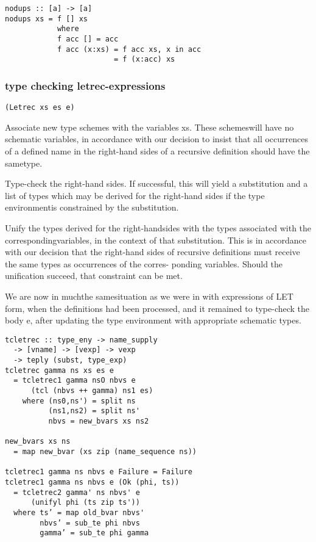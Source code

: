 \documentclass[8pt]{extarticle}
\begin{document}
\begin{multicols*}{2}
\begin{verbatim}
nodups :: [a] -> [a]
nodups xs = f [] xs
            where
            f acc [] = acc
            f acc (x:xs) = f acc xs, x in acc
                         = f (x:acc) xs
\end{verbatim}

\vfill\null
\columnbreak

\subsubsection{type checking letrec-expressions}

\verb|(Letrec xs es e)|

Associate new type schemes with the variables xs. These schemeswill
have no schematic variables, in accordance with our decision to insist
that all occurrences of a defined name in the right-hand sides of a
recursive definition should have the sametype.

Type-check the right-hand sides. If successful, this will yield a
substitution and a list of types which may be derived for the right-hand
sides if the type environmentis constrained by the substitution.

Unify the types derived for the right-handsides with the types associated
with the correspondingvariables, in the context of that substitution. This
is in accordance with our decision that the right-hand sides of recursive
definitions must receive the same types as occurrences of the corres-
ponding variables. Should the unification succeed, that constraint can be
met.

We are now in muchthe samesituation as we were in with expressions of
LET form, when the definitions had been processed, and it remained to
type-check the body e, after updating the type environment with
appropriate schematic types.

\begin{verbatim}
tcletrec :: type_eny -> name_supply
  -> [vname] -> [vexp] -> vexp
  -> teply (subst, type_exp)
tcletrec gamma ns xs es e
  = tcletrec1 gamma nsO nbvs e
      (tcl (nbvs ++ gamma) ns1 es)
    where (ns0,ns') = split ns
          (ns1,ns2) = split ns'
          nbvs = new_bvars xs ns2

new_bvars xs ns 
  = map new_bvar (xs zip (name_sequence ns))

tcletrec1 gamma ns nbvs e Failure = Failure
tcletrec1 gamma ns nbvs e (Ok (phi, ts))
  = tcletrec2 gamma' ns nbvs' e
      (unifyl phi (ts zip ts'))
  where ts’ = map old_bvar nbvs'
        nbvs’ = sub_te phi nbvs
        gamma’ = sub_te phi gamma


\end{verbatim}
\end{multicols*}
\end{document}
